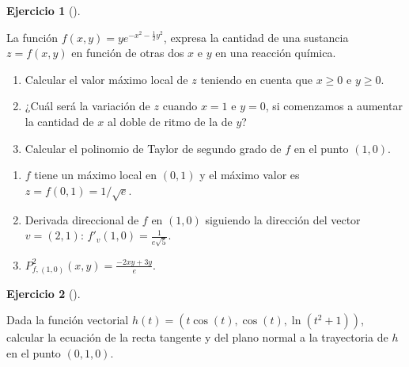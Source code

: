 \documentclass[
  a4paper,
]{scrreport}
\providecommand{\tightlist}{%
  \setlength{\itemsep}{0pt}\setlength{\parskip}{0pt}}\usepackage{longtable,booktabs,array}
\theoremstyle{definition}
\newtheorem{exercise}{Ejercicio}[chapter]
\theoremstyle{remark}
\begin{document}
\begin{exercise}[]\protect\hypertarget{exr-3}{}\label{exr-3}

La función \(f(x,y)=ye^{-x^2-\frac{1}{2}y^2}\), expresa la cantidad de
una sustancia \(z=f(x,y)\) en función de otras dos \(x\) e \(y\) en una
reacción química.

\begin{enumerate}
\def\labelenumi{\arabic{enumi}.}
\item
  Calcular el valor máximo local de \(z\) teniendo en cuenta que
  \(x\geq 0\) e \(y\geq 0\).
\item
  ¿Cuál será la variación de \(z\) cuando \(x=1\) e \(y=0\), si
  comenzamos a aumentar la cantidad de \(x\) al doble de ritmo de la de
  \(y\)?
\item
  Calcular el polinomio de Taylor de segundo grado de \(f\) en el punto
  \((1,0)\).
\end{enumerate}

\end{exercise}

\begin{tcolorbox}[enhanced jigsaw, opacitybacktitle=0.6, titlerule=0mm, bottomtitle=1mm, toptitle=1mm, breakable, bottomrule=.15mm, left=2mm, opacityback=0, toprule=.15mm, leftrule=.75mm, colframe=quarto-callout-tip-color-frame, coltitle=black, rightrule=.15mm, colback=white, title=\textcolor{quarto-callout-tip-color}{\faLightbulb}\hspace{0.5em}{Solución}, arc=.35mm, colbacktitle=quarto-callout-tip-color!10!white]

\begin{enumerate}
\def\labelenumi{\arabic{enumi}.}
\tightlist
\item
  \(f\) tiene un máximo local en \((0,1)\) y el máximo valor es
  \(z=f(0,1)=1/\sqrt{e}\).
\item
  Derivada direccional de \(f\) en \((1,0)\) siguiendo la dirección del
  vector \(v=(2,1)\): \(f'_v(1,0)=\frac{1}{e\sqrt{5}}\).
\item
  \(P^2_{f,(1,0)}(x,y)=\displaystyle\frac{-2xy+3y}{e}\).
\end{enumerate}

\end{tcolorbox}

\begin{exercise}[]\protect\hypertarget{exr-4}{}\label{exr-4}

Dada la función vectorial \(h(t)=(t\cos(t), \cos(t), \ln(t^2+1))\),
calcular la ecuación de la recta tangente y del plano normal a la
trayectoria de \(h\) en el punto \((0,1,0)\).

\end{exercise}
\end{document}

